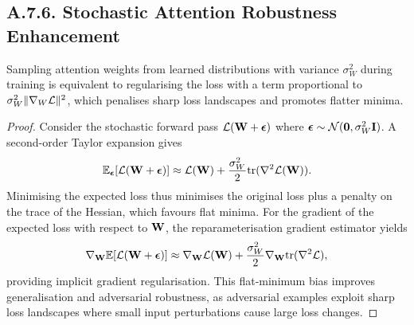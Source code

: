 \subsection*{A.7.6. Stochastic Attention Robustness Enhancement}
\label{app:stoch_attention}

\begin{proposition}
Sampling attention weights from learned distributions with variance $\sigma_W^2$ during training is equivalent to regularising the loss with a term proportional to $\sigma_W^2\|\nabla_W\mathcal{L}\|^2$, which penalises sharp loss landscapes and promotes flatter minima.
\end{proposition}

\begin{proof}
Consider the stochastic forward pass $\mathcal{L}(\mathbf{W}+\bm{\epsilon})$ where $\bm{\epsilon}\sim\mathcal{N}(\mathbf{0},\sigma_W^2\mathbf{I})$. A second-order Taylor expansion gives
\begin{equation}
\mathbb{E}_{\bm{\epsilon}}[\mathcal{L}(\mathbf{W}+\bm{\epsilon})]
\approx \mathcal{L}(\mathbf{W}) + \frac{\sigma_W^2}{2}\mathrm{tr}(\nabla^2\mathcal{L}(\mathbf{W})).
\end{equation}
Minimising the expected loss thus minimises the original loss plus a penalty on the trace of the Hessian, which favours flat minima. For the gradient of the expected loss with respect to $\mathbf{W}$, the reparameterisation gradient estimator yields
\begin{equation}
\nabla_{\mathbf{W}}\mathbb{E}[\mathcal{L}(\mathbf{W}+\bm{\epsilon})] \approx \nabla_{\mathbf{W}}\mathcal{L}(\mathbf{W}) + \frac{\sigma_W^2}{2}\nabla_{\mathbf{W}}\mathrm{tr}(\nabla^2\mathcal{L}),
\end{equation}
providing implicit gradient regularisation. This flat-minimum bias improves generalisation and adversarial robustness, as adversarial examples exploit sharp loss landscapes where small input perturbations cause large loss changes.
\end{proof}
